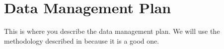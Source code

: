 \documentclass[nsfdata]{nsfproposal}
\begin{document}
\section*{Data Management Plan}

This is where you describe the data management plan. We will use the
methodology described in \cite{burd-jackson-2009-partic} because it
is a good one.

\newpage
\AtBeginShipout{%
\AtBeginShipoutDiscard
}


\end{document}
